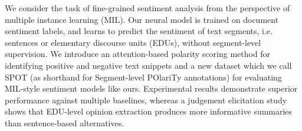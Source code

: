 We consider the task of fine-grained sentiment analysis from the perspective of multiple instance learning (MIL). Our neural model is trained on document sentiment labels, and learns to predict the sentiment of text segments, i.e. sentences or elementary discourse units (EDUs), without segment-level supervision. We introduce an attention-based polarity scoring method for identifying positive and negative text snippets and a new dataset which we call SPOT (as shorthand for Segment-level POlariTy annotations) for evaluating MIL-style sentiment models like ours. Experimental results demonstrate superior performance against multiple baselines, whereas a judgement elicitation study shows that EDU-level opinion extraction produces more informative summaries than sentence-based alternatives.
